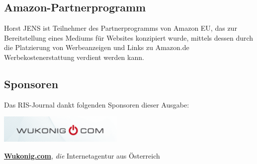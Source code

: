 \subsection*{Amazon-Partnerprogramm}
Horst JENS ist Teilnehmer des Partnerprogramms von Amazon EU, das zur Bereitstellung eines Mediums für Websites konzipiert wurde, mittels dessen durch die Platzierung von Werbeanzeigen und Links zu Amazon.de Werbekostenerstattung verdient werden kann.

\subsection*{Sponsoren}
Das RIS-Journal dankt folgenden Sponsoren dieser Ausgabe:
\begin{center}
\includegraphics[width=6cm]{impressum/wukonig.png}
\end{center}
\href{http://wukonig.com}{\textbf{Wukonig.com}}, \textit{die} Internetagentur aus Österreich
